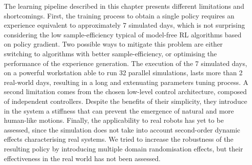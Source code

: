 The learning pipeline described in this chapter presents different limitations and shortcomings.
First, the training process to obtain a single policy requires an experience equivalent to approximately 7 simulated days, which is not surprising considering the low sample-efficiency typical of model-free \ac{RL} algorithms based on policy gradient.
Two possible ways to mitigate this problem are either switching to algorithms with better sample-efficiency, or optimising the performance of the experience generation.
The execution of the 7 simulated days, on a powerful workstation able to run 32 parallel simulations, lasts more than 2 real-world days, resulting in a long and extenuating parameters tuning process.
A second limitation comes from the chosen low-level control architecture, composed of independent \pid controllers.
Despite the benefits of their simplicity, they introduce in the system a stiffness that can prevent the emergence of natural and more human-like motions.
Finally, the applicability to real robots has yet to be assessed, since the simulation does not take into account second-order dynamic effects characterising real systems.
We tried to increase the robustness of the resulting policy by introducing multiple domain randomisation effects, but their effectiveness in the real world has not been assessed.
